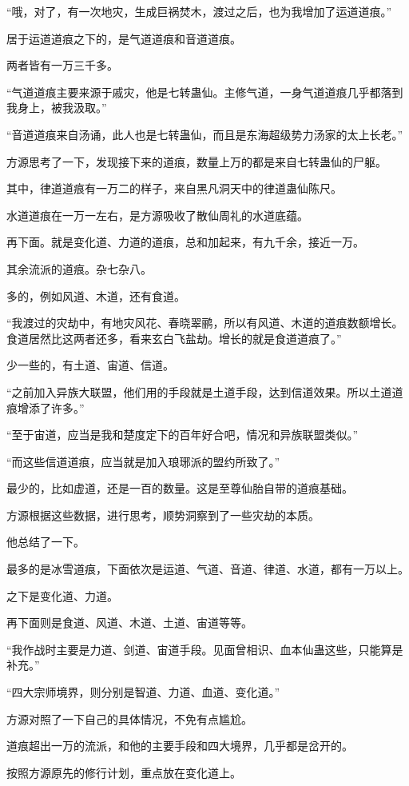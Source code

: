 \begin{this_body}
“哦，对了，有一次地灾，生成巨祸焚木，渡过之后，也为我增加了运道道痕。”

居于运道道痕之下的，是气道道痕和音道道痕。

两者皆有一万三千多。

“气道道痕主要来源于戚灾，他是七转蛊仙。主修气道，一身气道道痕几乎都落到我身上，被我汲取。”

“音道道痕来自汤诵，此人也是七转蛊仙，而且是东海超级势力汤家的太上长老。”

方源思考了一下，发现接下来的道痕，数量上万的都是来自七转蛊仙的尸躯。

其中，律道道痕有一万二的样子，来自黑凡洞天中的律道蛊仙陈尺。

水道道痕在一万一左右，是方源吸收了散仙周礼的水道底蕴。

再下面。就是变化道、力道的道痕，总和加起来，有九千余，接近一万。

其余流派的道痕。杂七杂八。

多的，例如风道、木道，还有食道。

“我渡过的灾劫中，有地灾风花、春晓翠鹂，所以有风道、木道的道痕数额增长。食道居然比这两者还多，看来玄白飞盐劫。增长的就是食道道痕了。”

少一些的，有土道、宙道、信道。

“之前加入异族大联盟，他们用的手段就是土道手段，达到信道效果。所以土道道痕增添了许多。”

“至于宙道，应当是我和楚度定下的百年好合吧，情况和异族联盟类似。”

“而这些信道道痕，应当就是加入琅琊派的盟约所致了。”

最少的，比如虚道，还是一百的数量。这是至尊仙胎自带的道痕基础。

方源根据这些数据，进行思考，顺势洞察到了一些灾劫的本质。

他总结了一下。

最多的是冰雪道痕，下面依次是运道、气道、音道、律道、水道，都有一万以上。

之下是变化道、力道。

再下面则是食道、风道、木道、土道、宙道等等。

“我作战时主要是力道、剑道、宙道手段。见面曾相识、血本仙蛊这些，只能算是补充。”

“四大宗师境界，则分别是智道、力道、血道、变化道。”

方源对照了一下自己的具体情况，不免有点尴尬。

道痕超出一万的流派，和他的主要手段和四大境界，几乎都是岔开的。

按照方源原先的修行计划，重点放在变化道上。


\end{this_body}
